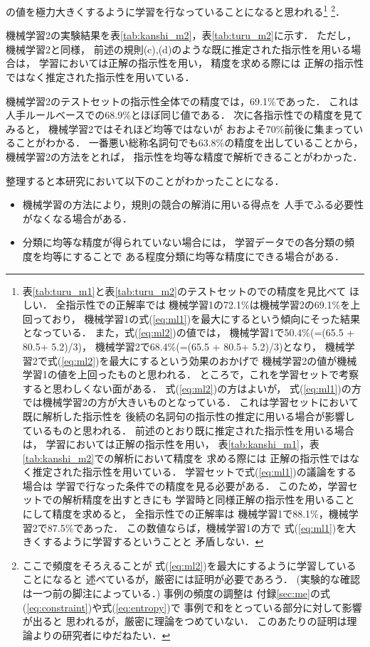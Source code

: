 の値を極力大きくするように学習を行なっていることになると思われる\footnote{
表\ref{tab:turu_m1}と表\ref{tab:turu_m2}のテストセットのでの精度を見比べて
ほしい．
全指示性での正解率では
機械学習1の72.1\%は機械学習2の69.1\%を上回っており，
機械学習1の式(\ref{eq:ml1})を最大にするという傾向にそった結果となっている．
また，式(\ref{eq:ml2})の値では，
機械学習1で50.4\%(=(65.5 + 80.5+ 5.2)/3)，
機械学習2で68.4\%(=(65.5 + 80.5+ 5.2)/3)となり，
機械学習2で式(\ref{eq:ml2})を最大にするという効果のおかげで
機械学習2の値が機械学習1の値を上回ったものと思われる．
ところで，これを学習セットで考察すると思わしくない面がある．
式(\ref{eq:ml2})の方はよいが，
式(\ref{eq:ml1})の方では機械学習2の方が大きいものとなっている．
これは学習セットにおいて既に解析した指示性を
後続の名詞句の指示性の推定に用いる場合が影響しているものと思われる．
前述のとおり既に推定された指示性を用いる場合は，
学習においては正解の指示性を用い，
表\ref{tab:kanshi_m1}，表\ref{tab:kanshi_m2}での解析において精度を
求める際には
正解の指示性ではなく推定された指示性を用いている．
学習セットで式(\ref{eq:ml1})の議論をする場合は
学習で行なった条件での精度を見る必要がある．
このため，学習セットでの解析精度を出すときにも
学習時と同様正解の指示性を用いることにして精度を求めると，
全指示性での正解率は
機械学習1で88.1\%，機械学習2で87.5\%であった．
この数値ならば，機械学習1の方で
式(\ref{eq:ml1})を大きくするように学習するということと
矛盾しない．} \footnote{ここで頻度をそろえることが
式(\ref{eq:ml2})を最大にするように学習していることになると
述べているが，厳密には証明が必要であろう．
(実験的な確認は一つ前の脚注によっている．)
事例の頻度の調整は
付録\ref{sec:me}の式(\ref{eq:constraint})や式(\ref{eq:entropy})で
事例で和をとっている部分に対して影響が出ると
思われるが，厳密に理論をつめていない．
このあたりの証明は理論よりの研究者にゆだねたい．}．

機械学習2の実験結果を表\ref{tab:kanshi_m2}，表\ref{tab:turu_m2}に示す．
ただし，機械学習2と同様，
前述の規則(c),(d)のような既に推定された指示性を用いる場合は，
学習においては正解の指示性を用い，
精度を求める際には
正解の指示性ではなく推定された指示性を用いている．

機械学習2のテストセットの指示性全体での精度では，69.1\%であった．
これは人手ルールベースでの68.9\%とほぼ同じ値である．
次に各指示性での精度を見てみると，
機械学習2ではそれほど均等ではないが
おおよそ70\%前後に集まっていることがわかる．
一番悪い総称名詞句でも63.8\%の精度を出していることから，
機械学習2の方法をとれば，
指示性を均等な精度で解析できることがわかった．

整理すると本研究において以下のことがわかったことになる．
\begin{itemize}
\item 
  機械学習の方法により，規則の競合の解消に用いる得点を
  人手でふる必要性がなくなる場合がある．
\item 
  分類に均等な精度が得られていない場合には，
  学習データでの各分類の頻度を均等にすることで
  ある程度分類に均等な精度にできる場合がある．
\end{itemize}

